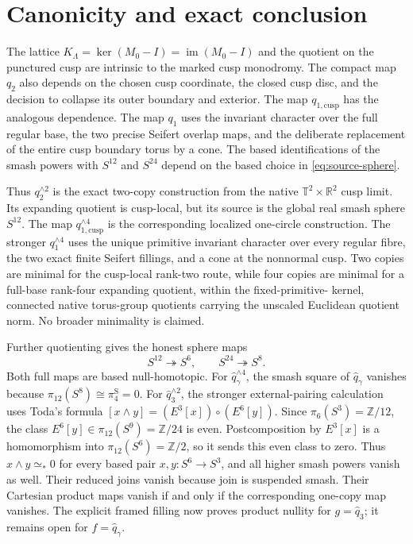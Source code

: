 \documentclass[11pt,letterpaper]{article}
\numberwithin{equation}{section}
\theoremstyle{definition}
\theoremstyle{remark}
\newcommand{\R}{\mathbb R}
\newcommand{\Z}{\mathbb Z}
\newcommand{\T}{\mathbb T}
\newcommand{\im}{\operatorname{im}}
\begin{document}
\section{Canonicity and exact conclusion}

The lattice
$K_\Lambda=\ker(M_0-I)=\im(M_0-I)$ and the quotient on the punctured
cusp are intrinsic to the marked cusp monodromy.  The compact map $q_2$
also depends on the chosen cusp coordinate, the closed cusp disc, and the
decision to collapse its outer boundary and exterior.  The map
$q_{1,\mathrm{cusp}}$ has the analogous dependence.  The map $q_1$ uses
the invariant character over the full regular base, the two precise
Seifert overlap maps, and the deliberate replacement of the entire cusp
boundary torus by a cone.  The based identifications of the smash powers
with $S^{12}$ and $S^{24}$ depend on the based choice in
\cref{eq:source-sphere}.

Thus \(q_2^{\wedge2}\) is the exact two-copy construction from the native
\(\T^2\times\R^2\) cusp limit.  Its expanding quotient is cusp-local, but
its source is the global real smash sphere \(S^{12}\).  The map
\(q_{1,\mathrm{cusp}}^{\wedge4}\) is the corresponding localized
one-circle construction.  The stronger \(q_1^{\wedge4}\) uses the unique
primitive invariant character over every regular fibre, the two exact
finite Seifert fillings, and a cone at the nonnormal cusp.  Two copies are
minimal for the cusp-local rank-two route, while four copies are minimal
for a full-base rank-four expanding quotient, within the fixed-primitive-
kernel, connected native torus-group quotients carrying the unscaled
Euclidean quotient norm.  No broader minimality is claimed.

Further quotienting gives the honest sphere maps
\[
 S^{12}\twoheadrightarrow S^6,\qquad S^{24}\twoheadrightarrow S^8.
\]
Both full maps are based null-homotopic.  For
\(\widehat q_\gamma^{\wedge4}\), the smash square of
\(\widehat q_\gamma\) vanishes because
\(\pi_{12}(S^8)\cong\pi_4^{\mathrm S}=0\).  For
\(\widehat q_3^{\wedge2}\), the stronger external-pairing calculation uses
Toda's formula
\([x\wedge y]=(E^3[x])\circ(E^6[y])\).  Since
\(\pi_6(S^3)=\Z/12\), the class \(E^6[y]\in\pi_{12}(S^9)=\Z/24\) is
even.  Postcomposition by \(E^3[x]\) is a homomorphism into
\(\pi_{12}(S^6)=\Z/2\), so it sends this even class to zero.  Thus
\(x\wedge y\simeq_*0\) for every based pair \(x,y:S^6\to S^3\), and all
higher smash powers vanish as well.  Their reduced joins vanish because
join is suspended smash.  Their Cartesian product maps vanish if and only
if the corresponding one-copy map vanishes. The explicit framed filling
now proves product nullity for \(g=\widehat q_3\); it remains open for
\(f=\widehat q_\gamma\).
\end{document}
